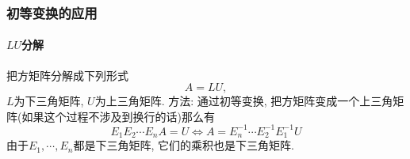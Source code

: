 \subsubsection{初等变换的应用}
\paragraph{$LU$分解}
把方矩阵分解成下列形式 
\begin{equation}
  A = LU,
\end{equation}
$L$为下三角矩阵, $U$为上三角矩阵.
方法: 通过初等变换, 把方矩阵变成一个上三角矩阵(如果这个过程不涉及到换行的话)那么有
\begin{equation}
  E_1 E_2 \cdots E_{n} A = U \iff A = E_n ^{-1} \cdots E_2^{-1} E_1^{-1} U
\end{equation}
由于$E_1 ,\cdots ,E_n$都是下三角矩阵, 它们的乘积也是下三角矩阵.

